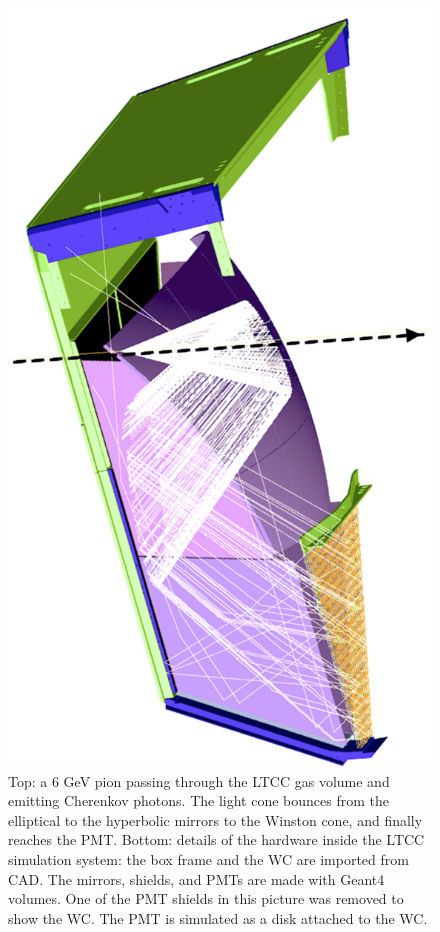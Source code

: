 \begin{figure}
	\centering
	\includegraphics[width=0.99\columnwidth, keepaspectratio]{img/richGeometry.png}
	\caption{Top: a 6 GeV pion passing through the LTCC gas volume and emitting Cherenkov photons. The light cone
            bounces from the elliptical to the hyperbolic mirrors to the Winston cone, and finally reaches the PMT.
            Bottom: details of the hardware inside the LTCC simulation system: the box frame and the WC are
            imported from CAD. The mirrors, shields, and PMTs are made with Geant4 volumes. One of the PMT shields
            in this picture was removed to show the WC. The PMT is simulated as a disk attached to the WC. }
	\label{fig:ltccGeometry}
\end{figure}

